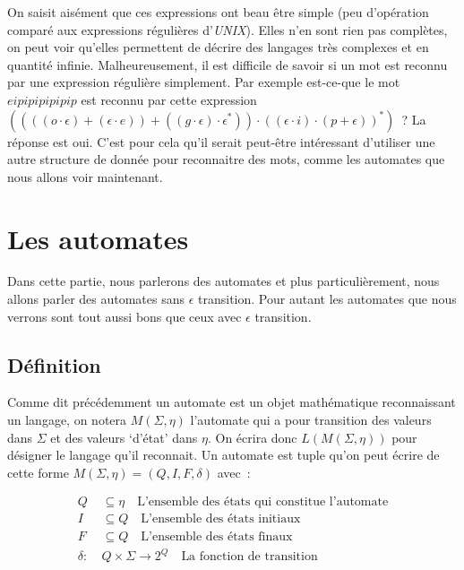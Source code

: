 \documentclass[12pt]{article}
\begin{document}
On saisit aisément que ces expressions ont beau être simple (peu d'opération
comparé aux expressions régulières d'\textit{UNIX}). Elles n'en sont rien pas
complètes, on peut voir qu'elles permettent de décrire des langages très
complexes et en quantité infinie. Malheureusement, il est difficile de savoir
si un mot est reconnu par une expression régulière simplement. Par exemple
est-ce-que le mot \(eipipipipipip\) est reconnu par cette expression \(((((o
\cdot \epsilon)+(\epsilon \cdot e))+((g\cdot \epsilon) \cdot \epsilon^*)) \cdot
((\epsilon \cdot i)\cdot (p+\epsilon))^*)\)~? La réponse est oui. C'est pour
cela qu'il serait peut-être intéressant d'utiliser une autre structure de
donnée pour reconnaitre des mots, comme les automates que nous allons voir
maintenant.

\section{Les automates}

Dans cette partie, nous parlerons des automates et plus particulièrement, nous
allons parler des automates sans \(\epsilon\) transition. Pour autant les
automates que nous verrons sont tout aussi bons que ceux avec \(\epsilon\)
transition.

\subsection{Définition}

Comme dit précédemment un automate est un objet mathématique reconnaissant un
langage, on notera \(M(\Sigma, \eta)\) l'automate qui a pour transition des
valeurs dans \(\Sigma\) et des valeurs `d'état' dans \(\eta\). On écrira donc
\(L(M(\Sigma, \eta))\) pour désigner le langage qu'il reconnait. Un automate
est tuple qu'on peut écrire de cette forme \(M(\Sigma, \eta) = (Q, I, F,
\delta)\) avec~:

\begin{align}
    Q        & \subseteq \eta \quad \text{L'ensemble des états qui constitue l'automate} \\
    I        & \subseteq Q \quad \text{L'ensemble des états initiaux}                    \\
    F        & \subseteq Q \quad \text{L'ensemble des états finaux}                      \\
    \delta:~ & Q \times \Sigma \to 2^Q \quad \text{La fonction de transition}
\end{align}
\end{document}
